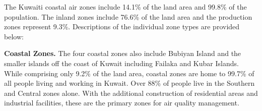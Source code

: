 \begin{sidewaystable}  %
\begin{table}[H]
\centering
\caption{Air quality zone statistics.}
\label{tb:aqzstats}
\end{table}
\end{sidewaystable}

The Kuwaiti coastal air zones include 14.1\% of the land area and 99.8\% of the population.  The inland zones include 76.6\% of the land area and the production zones represent 9.3\%.  Descriptions of the individual zone types are provided below:

\textbf{Coastal Zones.} The four coastal zones also include Bubiyan Island and the smaller islands off the coast of Kuwait including Failaka and Kubar Islands.  While comprising only 9.2\% of the land area, coastal zones are home to 99.7\% of all people living and working in Kuwait. Over 88\% of people live in the Southern and Central zones alone.  With the additional construction of residential areas and industrial facilities, these are the primary zones for air quality management. 

